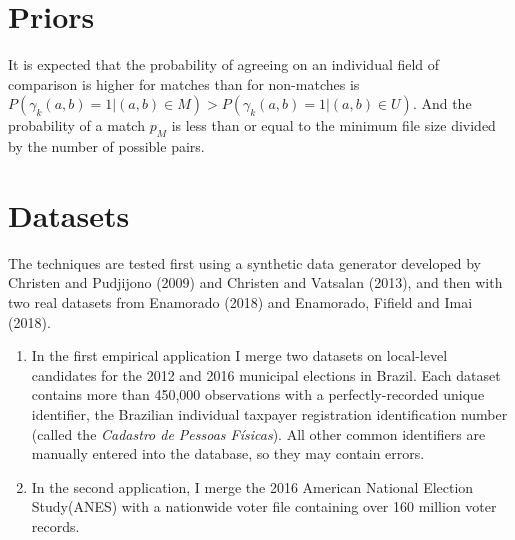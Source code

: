 \documentclass[11pt,reqno]{amsart}
\begin{document}
\section{Priors} 
It is expected that the probability of agreeing on an individual field of comparison is higher for matches than for non-matches is $P(\gamma_k(a,b) = 1 | (a,b) \in M) > P (\gamma_k(a, b) = 1 | (a,b) \in U) $.  And the probability of a match $p_M$ is less than or equal to the minimum file size divided by the number of possible pairs.  


\section{Datasets}
The techniques are tested first using a synthetic data generator developed by Christen and Pudjijono (2009) and Christen and Vatsalan (2013), and then with two real datasets from Enamorado (2018) and Enamorado, Fifield and Imai (2018). 
\begin{enumerate}
\item In the first empirical application I merge two datasets on local-level candidates for the 2012 and 2016 municipal elections in Brazil.  Each dataset contains more than 450,000 observations with a perfectly-recorded unique identifier, the Brazilian individual taxpayer registration identification number (called the \textit{Cadastro de Pessoas F\'isicas}).  All other common identifiers are manually entered into the database, so they may contain errors.  

\item In the second application, I merge the 2016 American National Election Study(ANES) with a nationwide voter file containing over 160 million voter records.  
\end{enumerate}
\end{document}
